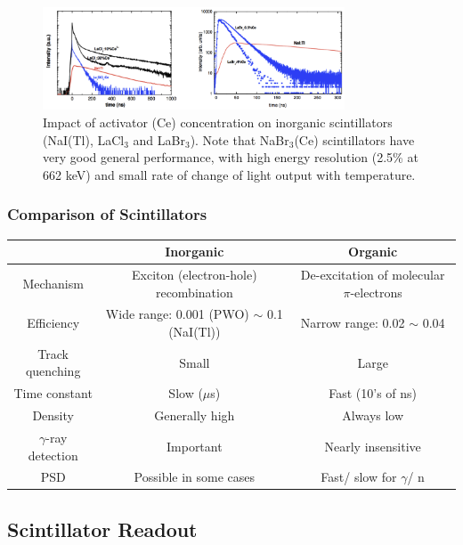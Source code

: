 \begin{figure}[ht]
    \centering
    \includegraphics[width=0.8\textwidth]{images/inorganic_scintillator_activator_concentration.png}
    \caption{Impact of activator (Ce) concentration on inorganic scintillators (NaI(Tl), LaCl$_3$ and LaBr$_3$). Note that NaBr$_3$(Ce) scintillators have very good general performance, with high energy resolution (2.5\% at 662 keV) and small rate of change of light output with temperature.}
    \label{fig:inorganic_scintillator_activator_concentration}
\end{figure}
\subsubsection{Comparison of Scintillators}
\begin{center}
\begin{tabular}{|c|c|c|}
    \hline
     & Inorganic & Organic \\
    \hline
    Mechanism & Exciton (electron-hole) recombination & De-excitation of molecular $\pi$-electrons \\
    \hline
    Efficiency & Wide range: 0.001 (PWO) $\sim$ 0.1 (NaI(Tl)) & Narrow range: 0.02 $\sim$ 0.04 \\
    \hline
    Track quenching & Small & Large \\
    \hline
    Time constant & Slow ($\mu$s) & Fast (10's of ns) \\
    \hline
    Density & Generally high & Always low\\
    \hline
    $\gamma$-ray detection & Important & Nearly insensitive \\
    \hline
    PSD & Possible in some cases & Fast/ slow for $\gamma$/ n\\
    \hline
\end{tabular}
\end{center}

\subsection{Scintillator Readout}
